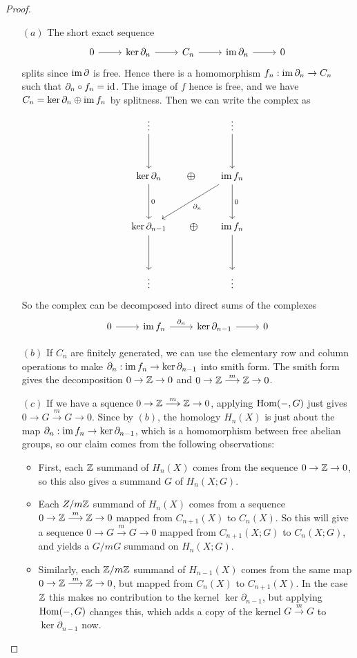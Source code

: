 \begin{proof}
\mbox{}
\begin{itemize}
\item[$(a)$]The short exact sequence 
\[\begin{tikzcd}
0\ar[r]&\ker\partial_n\ar[r]&C_n\ar[r]&\im\partial_n\ar[r]&0
\end{tikzcd}\]
splits since $\mathrm{im}\,\partial$ is free. Hence there is a homomorphism $f_n:\mathrm{im}\,\partial_n\to C_n$ such that $\partial_n\circ f_n=\mathrm{id}$. The image of $f$ hence is free, and we have $C_n=\mathrm{ker}\,\partial_n\oplus\mathrm{im}\, f_n$ by splitness. Then we can write the complex as
\[\begin{tikzcd}
\vdots\ar[dd]&&\vdots\ar[dd]\\
&&\\
\ker\partial_n\ar[draw=none]{rr}[name=X, anchor=center,scale=1.5]{\oplus}\ar[dd,"0"]&&\im f_n\ar[lldd,"\partial_n"]\ar[dd,"0"]\\
&&\\
\ker\partial_{n-1}\ar[dd]\ar[draw=none]{rr}[name=X, anchor=center,scale=1.5]{\oplus}&&\im f_n\ar[dd]\\
&&\\
\vdots&&\vdots
\end{tikzcd}\]
So the complex can be decomposed into direct sums of the complexes
\[\begin{tikzcd}
0\ar[r]&\im f_n\ar[r,"\partial_n"]&\ker\partial_{n-1}\ar[r]&0
\end{tikzcd}\]
\item[$(b)$] If $C_n$ are finitely generated, we can use the elementary row and column operations to make $\partial_n:\mathrm{im}\, f_n\to\mathrm{ker}\,\partial_{n-1}$ into smith form. The smith form gives the decomposition $0\to\mathbb{Z}\to0$ and $0\to\mathbb{Z}\stackrel{m}{\longrightarrow}\mathbb{Z}\to0$.
\item[$(c)$] If we have a squence $0\to\mathbb{Z}\stackrel{m}{\longrightarrow}\mathbb{Z}\to0$, applying $\mathrm{Hom}(-,G)$ just gives $0\to G\stackrel{m}{\longrightarrow}G\to0$. Since by $(b)$, the homology $H_n(X)$ is just about the map $\partial_n:\mathrm{im}\, f_n\to\mathrm{ker}\,\partial_{n-1}$, which is a homomorphism between free abelian groups, so our claim comes from the following observations:
\begin{itemize}
\item First, each $\mathbb{Z}$ summand of $H_n(X)$ comes from the sequence $0\to\mathbb{Z}\to 0$, so this also gives a summand $G$ of $H_n(X;G)$.
\item Each $Z/m\mathbb{Z}$ summand of $H_n(X)$ comes from a sequence $0\to\mathbb{Z}\stackrel{m}{\longrightarrow}\mathbb{Z}\to0$ mapped from $C_{n+1}(X)$ to $C_n(X)$. So this will give a sequence $0\to G\stackrel{m}{\longrightarrow}G\to0$ mapped from $C_{n+1}(X;G)$ to $C_n(X;G)$, and yields a $G/mG$ summand on $H_n(X;G)$.
\item Similarly, each $\mathbb{Z}/m\mathbb{Z}$ summand of $H_{n-1}(X)$ comes from the same map $0\to\mathbb{Z}\stackrel{m}{\longrightarrow}\mathbb{Z}\to0$, but mapped from $C_{n}(X)$ to $C_{n+1}(X)$. In the case $\mathbb{Z}$ this makes no contribution to the kernel $\ker\partial_{n-1}$, but applying $\mathrm{Hom}(-,G)$ changes this, which adds a copy of the kernel $G\stackrel{m}{\longrightarrow}G$ to $\ker\partial_{n-1}$ now.
\end{itemize}
\end{itemize}
\end{proof}
